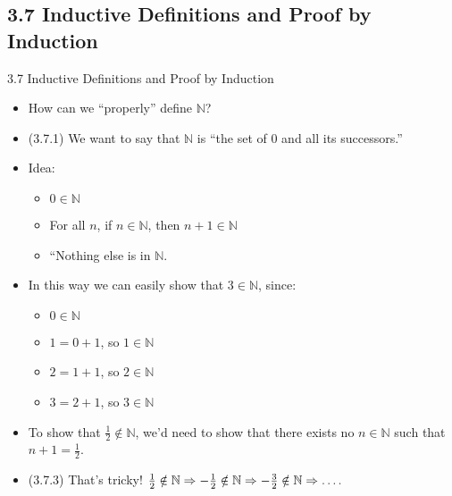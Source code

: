 \documentclass[../slides.tex]{subfiles}
\begin{document}
\subsection{3.7 Inductive Definitions and Proof by Induction}
\begin{frame}{3.7 Inductive Definitions and Proof by Induction}

	\begin{itemize}
	
		\item How can we ``properly'' define $\mathbb{N}$?
		
		\item (3.7.1) We want to say that $\mathbb{N}$ is ``the set of 0 and all its successors.''
		
		\item Idea:
		
		\begin{itemize}
		
			\item $0\in\mathbb{N}$
			
			\item For all $n$, if $n\in\mathbb{N}$, then $n+1\in\mathbb{N}$
			
			\item ``Nothing else is in $\mathbb{N}$.
		
		\end{itemize}
	
		\item In this way we can easily show that $3\in\mathbb{N}$, since:
		
		\begin{itemize}
		
			\item $0\in\mathbb{N}$
			
			\item $1=0+1$, so $1\in\mathbb{N}$
			\item $2=1+1$, so $2\in\mathbb{N}$
			\item $3=2+1$, so $3\in\mathbb{N}$
			
		\end{itemize}
		
		\item To show that $\frac{1}{2}\notin \mathbb{N}$, we'd need to show that there exists no $n\in\mathbb{N}$ such that $n+1=\frac{1}{2}$.
		
		\item (3.7.3) That's tricky! $\frac{1}{2}\notin \mathbb{N}\Rightarrow -\frac{1}{2}\notin\mathbb{N}\Rightarrow -\frac{3}{2}\notin\mathbb{N}\Rightarrow\mathellipsis.$
	
	\end{itemize}

\end{frame}
\end{document}
